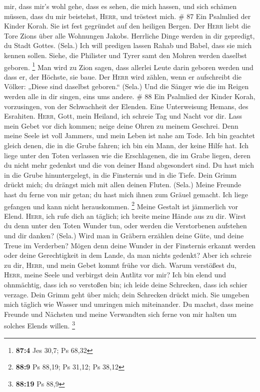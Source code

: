mir, dass mir's wohl gehe, dass es sehen, die mich hassen, und sich
schämen müssen, dass du mir beistehst, \textsc{Herr}, und tröstest mich.
\# 87  Ein Psalmlied der Kinder Korah. Sie ist fest
gegründet auf den heiligen Bergen.  Der \textsc{Herr}
liebt die Tore Zions über alle Wohnungen Jakobs. 
Herrliche Dinge werden in dir gepredigt, du Stadt Gottes. (Sela.)
 Ich will predigen lassen Rahab und Babel, dass sie mich
kennen sollen. Siehe, die Philister und Tyrer samt den Mohren werden
daselbst geboren. \footnote{\textbf{87:4} Jes 30,7; Ps 68,32}
 Man wird zu Zion sagen, dass allerlei Leute darin geboren
werden und dass er, der Höchste, sie baue.  Der
\textsc{Herr} wird zählen, wenn er aufschreibt die Völker: „Diese sind
daselbst geboren.`` (Sela.)  Und die Sänger wie die im
Reigen werden alle in dir singen, eins ums andere. \# 88 
Ein Psalmlied der Kinder Korah, vorzusingen, von der Schwachheit der
Elenden. Eine Unterweisung Hemans, des Esrahiten. 
\textsc{Herr}, Gott, mein Heiland, ich schreie Tag und Nacht vor dir.
 Lass mein Gebet vor dich kommen; neige deine Ohren zu
meinem Geschrei.  Denn meine Seele ist voll Jammers, und
mein Leben ist nahe am Tode.  Ich bin geachtet gleich
denen, die in die Grube fahren; ich bin ein Mann, der keine Hilfe hat.
 Ich liege unter den Toten verlassen wie die Erschlagenen,
die im Grabe liegen, deren du nicht mehr gedenkst und die von deiner
Hand abgesondert sind.  Du hast mich in die Grube
hinuntergelegt, in die Finsternis und in die Tiefe.  Dein
Grimm drückt mich; du drängst mich mit allen deinen Fluten. (Sela.)
 Meine Freunde hast du ferne von mir getan; du hast mich
ihnen zum Gräuel gemacht. Ich liege gefangen und kann nicht
herauskommen. \footnote{\textbf{88:9} Ps 88,19; Ps 31,12; Ps 38,12}
 Meine Gestalt ist jämmerlich vor Elend. \textsc{Herr},
ich rufe dich an täglich; ich breite meine Hände aus zu dir.
 Wirst du denn unter den Toten Wunder tun, oder werden
die Verstorbenen aufstehen und dir danken? (Sela.)  Wird
man in Gräbern erzählen deine Güte, und deine Treue im Verderben?
 Mögen denn deine Wunder in der Finsternis erkannt werden
oder deine Gerechtigkeit in dem Lande, da man nichts gedenkt?
 Aber ich schreie zu dir, \textsc{Herr}, und mein Gebet
kommt frühe vor dich.  Warum verstößest du,
\textsc{Herr}, meine Seele und verbirgst dein Antlitz vor mir?
 Ich bin elend und ohnmächtig, dass ich so verstoßen bin;
ich leide deine Schrecken, dass ich schier verzage.  Dein
Grimm geht über mich; dein Schrecken drückt mich.  Sie
umgeben mich täglich wie Wasser und umringen mich miteinander.
 Du machst, dass meine Freunde und Nächsten und meine
Verwandten sich ferne von mir halten um solches Elends willen.
\footnote{\textbf{88:19} Ps 88,9}

